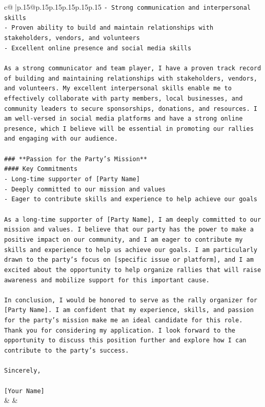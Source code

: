 \documentclass{article}
\begin{document}
{\begin{supertabular}{c@{$\;$}|p{.15\linewidth}@{}p{.15\linewidth}p{.15\linewidth}p{.15\linewidth}p{.15\linewidth}p{.15\linewidth}}
{{{\texttt{{-} Strong communication and interpersonal skills} \\
\texttt{{-} Proven ability to build and maintain relationships with stakeholders, vendors, and volunteers} \\
\texttt{{-} Excellent online presence and social media skills} \\
\\ 
\texttt{As a strong communicator and team player, I have a proven track record of building and maintaining relationships with stakeholders, vendors, and volunteers. My excellent interpersonal skills enable me to effectively collaborate with party members, local businesses, and community leaders to secure sponsorships, donations, and resources. I am well{-}versed in social media platforms and have a strong online presence, which I believe will be essential in promoting our rallies and engaging with our audience.} \\
\\ 
\texttt{\#\#\# **Passion for the Party's Mission**} \\
\texttt{\#\#\#\# Key Commitments} \\
\texttt{{-} Long{-}time supporter of {[}Party Name{]}} \\
\texttt{{-} Deeply committed to our mission and values} \\
\texttt{{-} Eager to contribute skills and experience to help achieve our goals} \\
\\ 
\texttt{As a long{-}time supporter of {[}Party Name{]}, I am deeply committed to our mission and values. I believe that our party has the power to make a positive impact on our community, and I am eager to contribute my skills and experience to help us achieve our goals. I am particularly drawn to the party's focus on {[}specific issue or platform{]}, and I am excited about the opportunity to help organize rallies that will raise awareness and mobilize support for this important cause.} \\
\\ 
\texttt{In conclusion, I would be honored to serve as the rally organizer for {[}Party Name{]}. I am confident that my experience, skills, and passion for the party's mission make me an ideal candidate for this role. Thank you for considering my application. I look forward to the opportunity to discuss this position further and explore how I can contribute to the party's success.} \\
\\ 
\texttt{Sincerely,} \\
\\ 
\texttt{{[}Your Name{]}} \\
            }
        }
    }
    & & \\ \\


\end{supertabular}}
\end{document}

